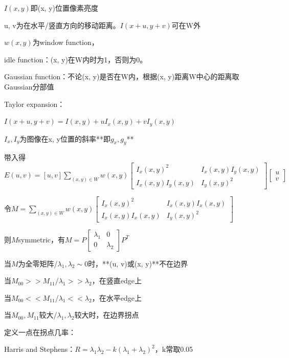 \documentclass[UTF8]{ctexart}
\begin{document}
  \quad \quad $I(x, y)$即(x, y)位置像素亮度

  \quad \quad u, v为在水平/竖直方向的移动距离。$I(x + u, y + v)$可在W外

  \quad \quad $w(x, y)$为window function，
  
  \quad \quad \quad idle function：(x, y)在W内时为1，否则为0。
  
  \quad \quad \quad Gaussian function：不论(x, y)是否在W内，根据(x, y)距离W中心的距离取Gaussian分部值
  
  \quad Taylor expansion：

  \quad \quad $I(x + u, y + v) = I(x, y) + uI_x(x, y) + vI_y(x, y)$

  \quad \quad \quad $I_x, I_y$为图像在x, y位置的斜率**即$g_x, g_y$**

  \quad \quad 带入得$E(u, v) = [u, v]\sum_{(x, y) \in W}w(x, y)
    \begin{bmatrix}
      I_x(x, y)^2 & I_x(x, y)I_y(x, y) \\
      I_x(x, y)I_y(x, y) & I_y(x, y)^2
      \end{bmatrix}
    \begin{bmatrix}
      u \\ 
      v
      \end{bmatrix}$

  \quad \quad 令$M = \sum_{(x, y) \in W}w(x, y)
    \begin{bmatrix}
      I_x(x, y)^2 & I_x(x, y)I_x(x, y) \\
      I_x(x, y)I_x(x, y) & I_y(x, y)^2
      \end{bmatrix}$

  \quad \quad 则$M$symmetric，有$M = P 
    \begin{bmatrix}
      \lambda_1 & 0 \\
      0 & \lambda_2
      \end{bmatrix} P^T$

  \quad \quad \quad 当$M$为全零矩阵/$\lambda_1,\lambda_2 \sim 0$时，**(u, v)或(x, y)**不在边界

  \quad \quad \quad 当$M_{00} >> M_{11}$/$\lambda_1 >> \lambda_2$，在竖直edge上

  \quad \quad \quad 当$M_{00} << M_{11}$/$\lambda_1 << \lambda_2$，在水平edge上

  \quad \quad \quad 当$M_{00}, M_{11}$较大/$\lambda_1, \lambda_2$较大时，在边界拐点

  \quad 定义一点在拐点几率：

  \quad \quad Harris and Stephens：$R = \lambda_1\lambda_2 - k(\lambda_1 + \lambda_2)^2$，k常取0.05
\end{document}
